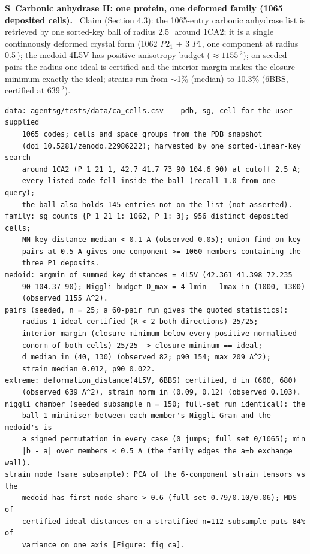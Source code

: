 \documentclass[11pt]{article}
\newcommand{\Ang}{\text{\AA}}
\newcounter{scheck}
\renewcommand{\thescheck}{S\arabic{scheck}}
\newcommand{\sitem}[2]{\medskip\noindent\refstepcounter{scheck}\label{#1}\textbf{\thescheck\ #2.}\ }
\begin{document}
\sitem{z:ca-benchmark}{Carbonic anhydrase II: one protein, one deformed family (1065 deposited cells)}
Claim (Section 4.3): the 1065-entry carbonic anhydrase list is retrieved by one sorted-key ball of radius 2.5\,\Ang\ around 1CA2; it is a single continuously deformed crystal form (1062 $P2_1$ + 3 $P1$, one component at radius 0.5\,\Ang); the medoid 4L5V has positive anisotropy budget ($\approx1155$\,\Ang$^2$); on seeded pairs the radius-one ideal is certified and the interior margin makes the closure minimum exactly the ideal; strains run from $\sim$1\% (median) to 10.3\% (6BBS, certified at 639\,\Ang$^2$).
\begin{footnotesize}\begin{verbatim}
data: agentsg/tests/data/ca_cells.csv -- pdb, sg, cell for the user-supplied
    1065 codes; cells and space groups from the PDB snapshot
    (doi 10.5281/zenodo.22986222); harvested by one sorted-linear-key search
    around 1CA2 (P 1 21 1, 42.7 41.7 73 90 104.6 90) at cutoff 2.5 A;
    every listed code fell inside the ball (recall 1.0 from one query);
    the ball also holds 145 entries not on the list (not asserted).
family: sg counts {P 1 21 1: 1062, P 1: 3}; 956 distinct deposited cells;
    NN key distance median < 0.1 A (observed 0.05); union-find on key
    pairs at 0.5 A gives one component >= 1060 members containing the
    three P1 deposits.
medoid: argmin of summed key distances = 4L5V (42.361 41.398 72.235
    90 104.37 90); Niggli budget D_max = 4 lmin - lmax in (1000, 1300)
    (observed 1155 A^2).
pairs (seeded, n = 25; a 60-pair run gives the quoted statistics):
    radius-1 ideal certified (R < 2 both directions) 25/25;
    interior margin (closure minimum below every positive normalised
    conorm of both cells) 25/25 -> closure minimum == ideal;
    d median in (40, 130) (observed 82; p90 154; max 209 A^2);
    strain median 0.012, p90 0.022.
extreme: deformation_distance(4L5V, 6BBS) certified, d in (600, 680)
    (observed 639 A^2), strain norm in (0.09, 0.12) (observed 0.103).
niggli chamber (seeded subsample n = 150; full-set run identical): the
    ball-1 minimiser between each member's Niggli Gram and the medoid's is
    a signed permutation in every case (0 jumps; full set 0/1065); min
    |b - a| over members < 0.5 A (the family edges the a=b exchange wall).
strain mode (same subsample): PCA of the 6-component strain tensors vs the
    medoid has first-mode share > 0.6 (full set 0.79/0.10/0.06); MDS of
    certified ideal distances on a stratified n=112 subsample puts 84% of
    variance on one axis [Figure: fig_ca].
\end{verbatim}\end{footnotesize}
\end{document}

